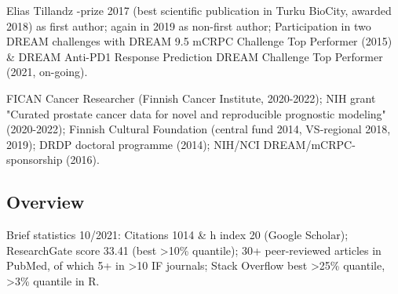 \documentclass[letterpaper]{twentysecondcv} %
\begin{document}
\vspace*{-0.2cm}
Elias Tillandz -prize 2017 (best scientific publication in Turku BioCity, awarded 2018) as first author; again in 2019 as non-first author; Participation in two DREAM challenges with DREAM 9.5 mCRPC Challenge Top Performer (2015) \& DREAM Anti-PD1 Response Prediction DREAM Challenge Top Performer (2021, on-going).



\vspace*{-0.1cm}
FICAN Cancer Researcher (Finnish Cancer Institute, 2020-2022); NIH grant "Curated prostate cancer data for novel and reproducible prognostic modeling" (2020-2022); Finnish Cultural Foundation (central fund 2014, VS-regional 2018, 2019); DRDP doctoral programme (2014); NIH/NCI DREAM/mCRPC-sponsorship (2016).

\subsection{Overview}

\vspace*{-0.2cm}
Brief statistics 10/2021: Citations 1014 \& h index 20 (Google Scholar); ResearchGate score 33.41 (best >10\% quantile); 30+ peer-reviewed articles in PubMed, of which 5+ in >10 IF journals; Stack Overflow best >25\% quantile, >3\% quantile in R.

\end{document}

